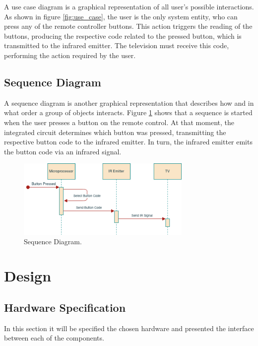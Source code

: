 \documentclass[12pt, letterpaper]{report}
\begin{document}
A use case diagram is a graphical representation of all user’s possible interactions. As shown in figure \ref{fig:use_case}, the user is the only system entity, who can press any of the remote controller buttons. This action triggers the reading of the buttons, producing the respective code related to the pressed button, which is transmitted to the infrared emitter. The television must receive this code, performing the action required by the user.

\section{Sequence Diagram}
A sequence diagram is another graphical representation that describes how and in what order a group of objects interacts. Figure \ref{fig:seq_diagram} shows that a sequence is started when the user presses a button on the remote control. At that moment, the integrated circuit determines which button was pressed, transmitting the respective button code to the infrared emitter. In turn, the infrared emitter emits the button code via an infrared signal.

\begin{figure}[ht]
	\centering
	\includegraphics[width=0.75\textwidth]{SequeceDiagram}
	\caption{Sequence Diagram.}
	\label{fig:seq_diagram}
\end{figure}

\chapter{Design}
\section{Hardware Specification}
In this section it will be specified the chosen hardware and presented the interface between each of the components.
\end{document}
